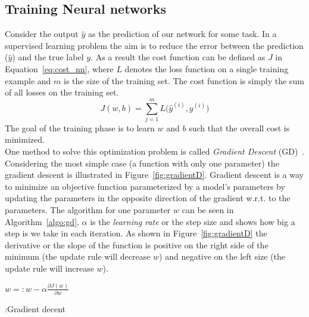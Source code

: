 \subsection{Training  Neural networks}
Consider the output $\hat { y } $ as the prediction of our network for some task. In a supervised learning problem the aim is to reduce the error between the prediction ($\hat { y } $) and the true label $y$. As a result the cost function can be defined as $J$ in Equation~\ref{eq:cost_nn}, where $L$ denotes the loss function on a single training example and $m$ is the size of the training set. The cost function is simply the sum of all losses on the training set.
\begin{equation}
J(w,b)=\sum _{ j=1 }^{ m }{ L( } \hat { y }^{ (i) } ,y^{ (i) })
\label{eq:cost_nn}
\end{equation}
The goal of the training phase is to learn $w$ and $b$ such that the overall cost is minimized. \\
\noindent 
One method to solve this optimization problem is called \emph{Gradient Descent} (GD)~. Considering the most simple case (a function with only one parameter) the gradient descent is illustrated in Figure~\ref{fig:gradientD}. Gradient descent is a way to minimize an objective function parameterized by a model’s parameters by updating the parameters in the opposite direction of the gradient w.r.t. to the parameters. The algorithm for one parameter $w$ can be
seen in Algorithm~\ref{algo:gd}, $\alpha$ is the \emph{learning rate} or the step size and shows how big a step is we take in each iteration. As shown in Figure~\ref{fig:gradientD} the derivative or the slope of the function is positive on the right side of the minimum (the update rule will decrease $w$) and negative on the left size (the update rule will increase $w$). \\


\begin{algorithm}[htbp]
  \begin{algorithmic}[1]
    \newcommand{\UF}{\mathrm{U}}
 \State $w=: w- \alpha\frac { \partial J(w) }{ \partial w } $
  \EndWhile
  \end{algorithmic}
\caption{:Gradient decent }
 \label{algo:gd}
\end{algorithm}


